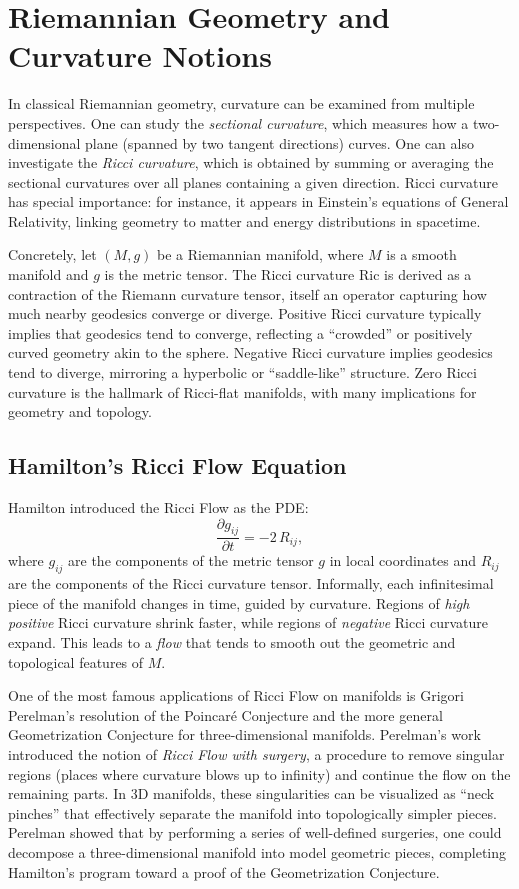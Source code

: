 \section{Riemannian Geometry and Curvature Notions}
In classical Riemannian geometry, curvature can be examined from multiple perspectives. One can study the \emph{sectional curvature}, which measures how a two-dimensional plane (spanned by two tangent directions) curves. One can also investigate the \emph{Ricci curvature}, which is obtained by summing or averaging the sectional curvatures over all planes containing a given direction. Ricci curvature has special importance: for instance, it appears in Einstein’s equations of General Relativity, linking geometry to matter and energy distributions in spacetime. 

Concretely, let $(M,g)$ be a Riemannian manifold, where $M$ is a smooth manifold and $g$ is the metric tensor. The Ricci curvature $\mathrm{Ric}$ is derived as a contraction of the Riemann curvature tensor, itself an operator capturing how much nearby geodesics converge or diverge. Positive Ricci curvature typically implies that geodesics tend to converge, reflecting a ``crowded'' or positively curved geometry akin to the sphere. Negative Ricci curvature implies geodesics tend to diverge, mirroring a hyperbolic or “saddle-like” structure. Zero Ricci curvature is the hallmark of Ricci-flat manifolds, with many implications for geometry and topology.

\subsection{Hamilton's Ricci Flow Equation}
Hamilton introduced the Ricci Flow as the PDE:
\[
\frac{\partial g_{ij}}{\partial t} = -2 \, R_{ij},
\]
where $g_{ij}$ are the components of the metric tensor $g$ in local coordinates and $R_{ij}$ are the components of the Ricci curvature tensor. Informally, each infinitesimal piece of the manifold changes in time, guided by curvature. Regions of \emph{high positive} Ricci curvature shrink faster, while regions of \emph{negative} Ricci curvature expand. This leads to a \emph{flow} that tends to smooth out the geometric and topological features of $M$. 

One of the most famous applications of Ricci Flow on manifolds is Grigori Perelman's resolution of the Poincar\'{e} Conjecture and the more general Geometrization Conjecture for three-dimensional manifolds. Perelman’s work introduced the notion of \emph{Ricci Flow with surgery}, a procedure to remove singular regions (places where curvature blows up to infinity) and continue the flow on the remaining parts. In 3D manifolds, these singularities can be visualized as ``neck pinches'' that effectively separate the manifold into topologically simpler pieces. Perelman showed that by performing a series of well-defined surgeries, one could decompose a three-dimensional manifold into model geometric pieces, completing Hamilton’s program toward a proof of the Geometrization Conjecture.

